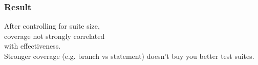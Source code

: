 \documentclass{beamer}
\newenvironment{changemargin}[1]{%
  \begin{list}{}{%
    \setlength{\topsep}{0pt}%
    \setlength{\leftmargin}{#1}%
    \setlength{\rightmargin}{1em}
    \setlength{\listparindent}{\parindent}%
    \setlength{\itemindent}{\parindent}%
    \setlength{\parsep}{\parskip}%
  }%
  \item[]}{\end{list}}
\begin{document}
\begin{frame}
  \frametitle{Result}

  \Large
  \begin{changemargin}{2em}
    After controlling for suite size, \\
    \hspace*{2em} coverage not strongly correlated \\
    \hspace*{2em} with effectiveness.\\[1em]
    Stronger coverage (e.g. branch vs statement) doesn't buy you better test suites.
  \end{changemargin}

\end{frame}

  
\end{document}
